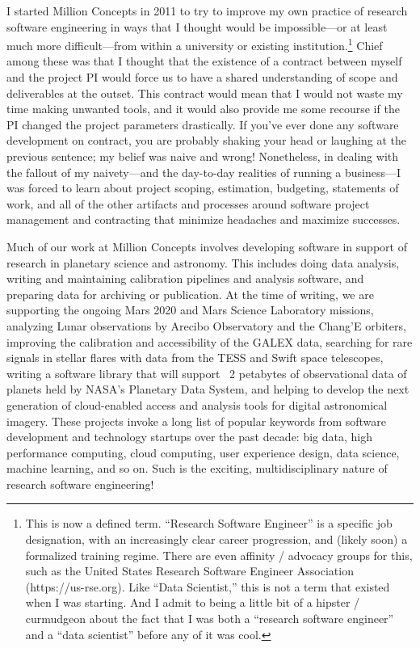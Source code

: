 \documentclass[12pt,oneside]{book}
\begin{document}
I started Million Concepts in 2011 to try to improve my own practice of research software engineering in ways that I thought would be impossible---or at least much more difficult---from within a university or existing institution.\footnote{This is now a defined term. “Research Software Engineer” is a specific job designation, with an increasingly clear career progression, and (likely soon) a formalized training regime. There are even affinity / advocacy groups for this, such as the United States Research Software Engineer Association (https://us-rse.org). Like “Data Scientist,” this is not a term that existed when I was starting. And I admit to being a little bit of a hipster / curmudgeon about the fact that I was both a ``research software engineer'' and a ``data scientist'' before any of it was cool.
} Chief among these was that I thought that the existence of a contract between myself and the project PI would force us to have a shared understanding of scope and deliverables at the outset. This contract would mean that I would not waste my time making unwanted tools, and it would also provide me some recourse if the PI changed the project parameters drastically. If you've ever done any software development on contract, you are probably shaking your head or laughing at the previous sentence; my belief was naive and wrong! Nonetheless, in dealing with the fallout of my naivety---and the day-to-day realities of running a business---I was forced to learn about project scoping, estimation, budgeting, statements of work, and all of the other artifacts and processes around software project management and contracting that minimize headaches and maximize successes.

Much of our work at Million Concepts involves developing software in support of research in planetary science and astronomy. This includes doing data analysis, writing and maintaining calibration pipelines and analysis software, and preparing data for archiving or publication. At the time of writing, we are supporting the ongoing Mars 2020 and Mars Science Laboratory missions, analyzing Lunar observations by Arecibo Observatory and the Chang'E orbiters, improving the calibration and accessibility of the GALEX data, searching for rare signals in stellar flares with data from the TESS and Swift space telescopes, writing a software library that will support ~2 petabytes of observational data of planets held by NASA's Planetary Data System, and helping to develop the next generation of cloud-enabled access and analysis tools for digital astronomical imagery. These projects invoke a long list of popular keywords from software development and technology startups over the past decade: big data, high performance computing, cloud computing, user experience design, data science, machine learning, and so on. Such is the exciting, multidisciplinary nature of research software engineering!
\end{document}
